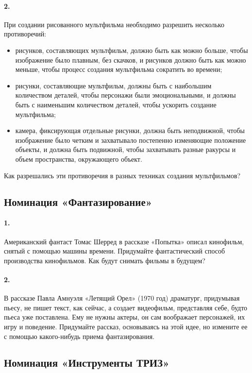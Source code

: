 \documentclass[11pt,a4paper]{article}
\begin{document}
\paragraph{2.}
При создании рисованного мультфильма необходимо разрешить несколько противоречий:
\begin{itemize}
\item рисунков, составляющих мультфильм, должно быть как можно больше, чтобы
  изображение было плавным, без скачков, и рисунков должно быть как можно
  меньше, чтобы процесс создания мультфильма сократить во времени;
\item рисунки, составляющие мультфильм, должны быть с наибольшим количеством
  деталей, чтобы персонажи были эмоциональными, и должны быть с наименьшим
  количеством деталей, чтобы ускорить создание мультфильма;
\item камера, фиксирующая отдельные рисунки, должна быть неподвижной, чтобы
  изображение было четким и захватывало постепенно изменяющие положение
  объекты, и должна быть подвижной, чтобы захватывать разные ракурсы и объем
  пространства, окружающего объект.
\end{itemize}
Как разрешались эти противоречия в разных техниках создания мультфильмов?

\subsection*{Номинация «Фантазирование»}

\paragraph{1.}
Американский фантаст Томас Шерред в рассказе «Попытка» описал кинофильм,
снятый с помощью машины времени. Придумайте фантастический способ производства
кинофильмов. Как будут снимать фильмы в будущем?

\paragraph{2.}
В рассказе Павла Амнуэля «Летящий Орел» (1970 год) драматург, придумывая
пьесу, не пишет текст, как сейчас, а создает видеофильм, представляя себе,
будто пьеса уже поставлена. Ему не нужны актеры, он сам воображает персонажей,
их игру и поведение. Придумайте рассказ, основываясь на этой идее, но измените
ее с помощью какого-нибудь приема фантазирования.

\subsection*{Номинация «Инструменты ТРИЗ»}
\end{document}
